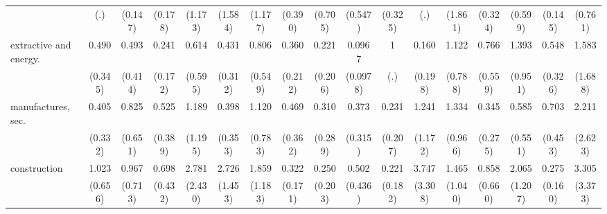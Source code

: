 {\begin{tabular}{l*{16}{c}}
                    &         (.)         &     (0.147)         &     (0.178)         &     (1.173)         &     (1.584)         &     (1.177)         &     (0.390)         &     (0.705)         &     (0.547)         &     (0.325)         &         (.)         &     (1.861)         &     (0.324)         &     (0.599)         &     (0.145)         &     (0.761)         \\
[1em]
extractive and energy.&       0.490         &       0.493         &       0.241\sym{*}  &       0.614         &       0.431         &       0.806         &       0.360         &       0.221         &      0.0967\sym{*}  &           1         &       0.160         &       1.122         &       0.766         &       1.393         &       0.548         &       1.583         \\
                    &     (0.345)         &     (0.414)         &     (0.172)         &     (0.595)         &     (0.312)         &     (0.549)         &     (0.212)         &     (0.206)         &    (0.0978)         &         (.)         &     (0.198)         &     (0.788)         &     (0.559)         &     (0.951)         &     (0.326)         &     (1.688)         \\
[1em]
manufactures, sec.  &       0.405         &       0.825         &       0.525         &       1.189         &       0.398         &       1.120         &       0.469         &       0.310         &       0.373         &       0.231         &       1.241         &       1.334         &       0.345         &       0.585         &       0.703         &       2.211         \\
                    &     (0.332)         &     (0.651)         &     (0.389)         &     (1.195)         &     (0.353)         &     (0.783)         &     (0.362)         &     (0.289)         &     (0.315)         &     (0.207)         &     (1.172)         &     (0.966)         &     (0.275)         &     (0.551)         &     (0.453)         &     (2.623)         \\
[1em]
construction        &       1.023         &       0.967         &       0.698         &       2.781         &       2.726         &       1.859         &       0.322\sym{*}  &       0.250         &       0.502         &       0.221         &       3.747         &       1.465         &       0.858         &       2.065         &       0.275\sym{*}  &       3.305         \\
                    &     (0.656)         &     (0.713)         &     (0.432)         &     (2.430)         &     (1.453)         &     (1.183)         &     (0.171)         &     (0.203)         &     (0.436)         &     (0.182)         &     (3.308)         &     (1.040)         &     (0.660)         &     (1.207)         &     (0.160)         &     (3.373)         \\

\end{tabular}}
